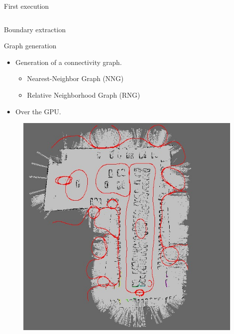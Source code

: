 \begin{frame}{First execution}
\begin{columns}
\begin{overlayarea}{\textwidth}{\textheight}
{\begin{block}{Boundary extraction}
\begin{itemize}
	  \end{itemize}
	\end{block}
      }
      {
	\begin{block}{Graph generation}
	\footnotesize
	  \begin{itemize}
	    \item Generation of a connectivity graph.
	    \begin{itemize}
	     \item<5-> Nearest-Neighbor Graph (NNG)
	     \item<6-> Relative Neighborhood Graph (RNG)
	    \end{itemize}
	    \item<7-> Over the GPU.
	  \end{itemize}
	  
	   {
	    \begin{figure}
	      \includegraphics[height=0.5\textheight]{figure3}
	    \end{figure}
	  }
	   {
	    \begin{figure}

\end{figure}}
\end{block}}
\end{overlayarea}
\end{columns}
\end{frame}
